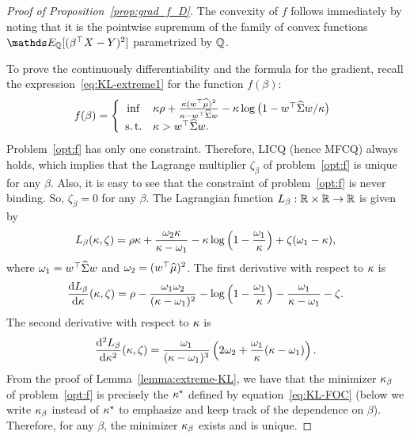 \documentclass{article}
\begin{document}
\begin{proof}[Proof of Proposition~\ref{prop:grad_f_D}]
    The convexity of $f$ follows immediately by noting that it is the pointwise supremum of the family of convex functions $\EE_\QQ[(\beta^\top X - Y)^2]$ parametrized by $\mathbb Q$.

    To prove the continuously differentiability and the formula for the gradient, recall the expression~\eqref{eq:KL-extreme1} for the function $f(\beta)$:
    \begin{equation}\label{opt:f}
        f (\beta)  = \left\{
	\begin{array}{cl}
	\inf &\kappa \rho  + \frac{\kappa (w^\top \widehat {\mu})^2}{\kappa - w^\top \widehat{\Sigma} w } - \kappa \log \big( 1 - w^\top \widehat{\Sigma} w/\kappa \big) \\
	\operatorname{s.t.} & \kappa > w^\top \widehat{\Sigma} w.
	\end{array}
	\right.
    \end{equation}
Problem~\eqref{opt:f} has only one constraint. Therefore, LICQ (hence MFCQ) always holds, which implies that the Lagrange multiplier $\zeta_\beta$ of problem~\eqref{opt:f} is unique for any $\beta$. Also, it is easy to see that the constraint of problem~\eqref{opt:f} is never binding. So, $\zeta_\beta = 0$ for any $\beta$. The Lagrangian function $L_{\beta}: \mathbb{R} \times \mathbb{R} \rightarrow \mathbb{R} $ is given by
\begin{equation*}
L_{\beta} (\kappa, \zeta) = \rho \kappa + \frac{\omega_2 \kappa}{\kappa - \omega_1} - \kappa \log\left(1- \frac{\omega_1}{\kappa} \right) + \zeta (\omega_1 - \kappa),
\end{equation*}
where $\omega_1 =  w^\top \widehat{\Sigma} w$ and $\omega_2 =  (w^\top \widehat {\mu})^2$.
The first derivative with respect to $\kappa$ is 
\begin{equation*}
\frac{\mathrm d L_\beta}{\mathrm d \kappa}(\kappa , \zeta) = \rho - \frac{\omega_1 \omega_2}{(\kappa- \omega_1)^2 } - \log\left( 1 - \frac{\omega_1}{\kappa} \right) - \frac{\omega_1}{\kappa - \omega_1} - \zeta.
\end{equation*}
The second derivative with respect to $\kappa$ is
\begin{equation*}
\frac{\mathrm d^2 L_\beta}{\mathrm d\kappa^2}(\kappa , \zeta) = \frac{\omega_1}{(\kappa - \omega_1)^3} \left( 2\omega_2 + \frac{\omega_1}{\kappa}(\kappa - \omega_1) \right) .
\end{equation*}
From the proof of Lemma~\ref{lemma:extreme-KL}, we have that the minimizer $\kappa_\beta$ of problem~\eqref{opt:f} is precisely the $ \kappa^\star$ defined by equation~\eqref{eq:KL-FOC} (below we write $\kappa_\beta$ instead of $ \kappa^\star$ to emphasize and keep track of the dependence on $\beta$). Therefore, for any $\beta$, the minimizer $\kappa_\beta$ exists and is unique.

\end{proof}
\end{document}
